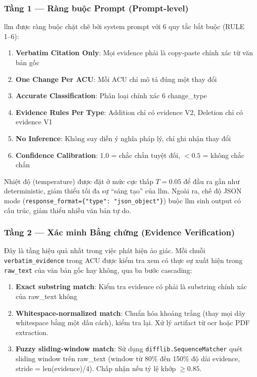 \subsubsection{Tầng 1 — Ràng buộc Prompt (Prompt-level)}

\gls{llm} được ràng buộc chặt chẽ bởi system prompt với 6 quy tắc bắt buộc (RULE 1--6):

\begin{enumerate}[label=(\arabic*)]
    \item \textbf{Verbatim Citation Only}: Mọi evidence phải là copy-paste chính xác từ văn bản gốc
    \item \textbf{One Change Per ACU}: Mỗi ACU chỉ mô tả đúng một thay đổi
    \item \textbf{Accurate Classification}: Phân loại chính xác 6 change\_type
    \item \textbf{Evidence Rules Per Type}: Addition chỉ có evidence V2, Deletion chỉ có evidence V1
    \item \textbf{No Inference}: Không suy diễn ý nghĩa pháp lý, chỉ ghi nhận thay đổi
    \item \textbf{Confidence Calibration}: 1.0 = chắc chắn tuyệt đối, $<0.5$ = không chắc chắn
\end{enumerate}

Nhiệt độ (temperature) được đặt ở mức cực thấp $T = 0.05$ để đầu ra gần như deterministic, giảm thiểu tối đa sự ``sáng tạo'' của \gls{llm}. Ngoài ra, chế độ JSON mode (\texttt{response\_format=\{"type": "json\_object"\}}) buộc \gls{llm} sinh output có cấu trúc, giảm thiểu nhiễu văn bản tự do.

\subsubsection{Tầng 2 — Xác minh Bằng chứng (Evidence Verification)}

Đây là tầng hiệu quả nhất trong việc phát hiện ảo giác. Mỗi chuỗi \texttt{verbatim\_evidence} trong ACU được kiểm tra xem có thực sự xuất hiện trong \texttt{raw\_text} của văn bản gốc hay không, qua ba bước cascading:

\begin{enumerate}[label=(\arabic*)]
    \item \textbf{Exact substring match}: Kiểm tra evidence có phải là substring chính xác của raw\_text không
    \item \textbf{Whitespace-normalized match}: Chuẩn hóa khoảng trắng (thay mọi dãy whitespace bằng một dấu cách), kiểm tra lại. Xử lý artifact từ \gls{ocr} hoặc PDF extraction.
    \item \textbf{Fuzzy sliding-window match}: Sử dụng \texttt{difflib.SequenceMatcher} \cite{python2024difflib} quét sliding window trên raw\_text (window từ 80\% đến 150\% độ dài evidence, stride = len(evidence)/4). Chấp nhận nếu tỷ lệ khớp $\geq 0.85$.
\end{enumerate}

